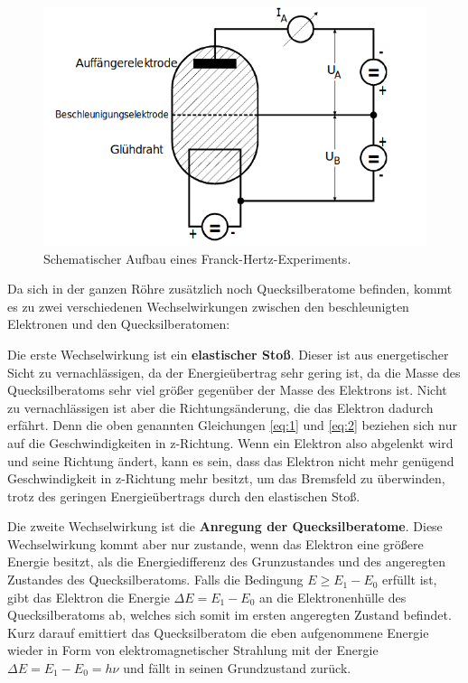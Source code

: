 \begin{figure}
  \centering
  \includegraphics[scale=0.5]{schematischerAufbau.png}
  \caption{Schematischer Aufbau eines Franck-Hertz-Experiments.\cite{Q1}}
  \label{abb:1}
\end{figure}

Da sich in der ganzen Röhre zusätzlich noch Quecksilberatome befinden, kommt es zu zwei verschiedenen Wechselwirkungen zwischen den beschleunigten
Elektronen und den Quecksilberatomen:

Die erste Wechselwirkung ist ein \textbf{elastischer Stoß}. Dieser ist aus energetischer Sicht zu vernachlässigen, da der Energieübertrag sehr gering ist, da die
Masse des Quecksilberatoms sehr viel größer gegenüber der Masse des Elektrons ist. Nicht zu vernachlässigen ist aber die Richtungsänderung, die das Elektron
dadurch erfährt. Denn die oben genannten Gleichungen \eqref{eq:1} und \eqref{eq:2} beziehen sich nur auf die Geschwindigkeiten in z-Richtung.
Wenn ein Elektron also abgelenkt wird und seine Richtung ändert, kann es sein, dass das Elektron nicht mehr genügend Geschwindigkeit in z-Richtung mehr besitzt,
um das Bremsfeld zu überwinden, trotz des geringen Energieübertrags durch den elastischen Stoß.

Die zweite Wechselwirkung ist die \textbf{Anregung der Quecksilberatome}. Diese Wechselwirkung kommt aber nur zustande, wenn das Elektron eine größere Energie
besitzt, als die Energiedifferenz des Grunzustandes und des angeregten Zustandes des Quecksilberatoms. Falls die Bedingung $E \geq E_1-E_0$ erfüllt ist, gibt das
Elektron die Energie $\Delta E = E_1-E_0$ an die Elektronenhülle des Quecksilberatoms ab, welches sich somit im ersten angeregten Zustand befindet.
Kurz darauf emittiert das Quecksilberatom die eben aufgenommene Energie wieder in Form von elektromagnetischer Strahlung mit der Energie
$\Delta E = E_1-E_0 = h \nu$ und fällt in seinen Grundzustand zurück.

